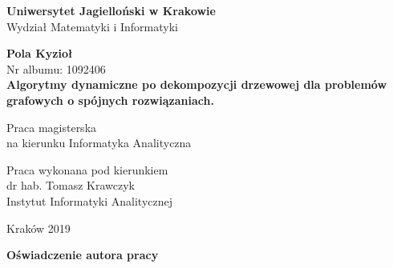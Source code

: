 \documentclass[12pt, oneside]{report}
\begin{document}
  
\thispagestyle{empty}
\begin{titlepage}
    \begin{center}

           \Large
    \textbf{Uniwersytet Jagielloński w Krakowie}\vspace{0.2cm}\\ Wydział Matematyki i Informatyki
               \vspace*{1cm}
               
         \vspace{3cm}
         \Large
          \textbf{Pola Kyzioł}\\\vspace{0.5cm}
         \normalsize Nr albumu: 1092406\\
             \vspace{2cm}
        \Huge
        \textbf{Algorytmy dynamiczne po dekompozycji drzewowej dla problemów grafowych o spójnych rozwiązaniach.}
      
        \vspace{1.5cm}
        \normalsize
        Praca magisterska\\
        na kierunku Informatyka Analityczna\\ \vspace{0.15cm}
        
        \vfill
        \vspace{2cm}
       \begin{minipage}{1\textwidth}
\begin{flushright}
Praca wykonana pod kierunkiem\\
dr hab. Tomasz Krawczyk\\
Instytut Informatyki Analitycznej 
\end{flushright}
\end{minipage}
        
        \vspace{2cm}
        \begin{center}
      Kraków 2019
        \end{center}
    \end{center}
\end{titlepage}

\newpage 
 \thispagestyle{empty}
\vspace{2.5cm}
\begin{flushleft}
\large \textbf{Oświadczenie autora pracy}\vspace{0.6cm}\\
\end{flushleft}
\end{document}

